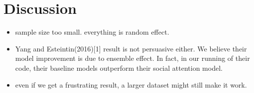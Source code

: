 
\section{Discussion}

\begin{itemize}
	\item sample size too small. everything is random effect.
	\item Yang and Esteintin(2016)[1] result is not persuasive either. We believe their model improvement is due to ensemble effect. In fact, in our running of their code, their baseline models outperform their social attention model.
	\item even if we get a frustrating result, a larger dataset might still make it work.
\end{itemize}